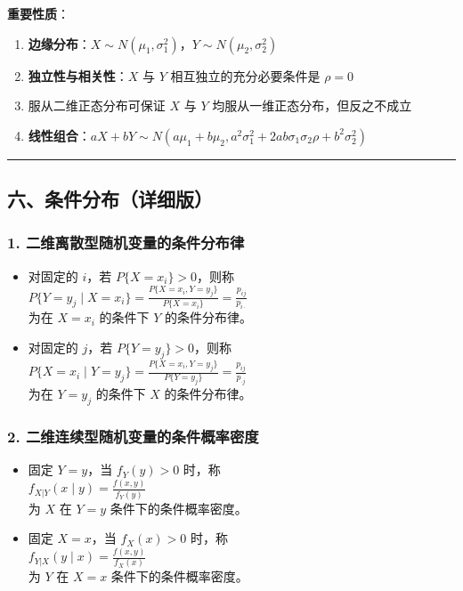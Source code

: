 \documentclass[12pt,a4paper]{ctexart}
\begin{document}
\textbf{重要性质}：
\begin{enumerate}[noitemsep]
    \item \textbf{边缘分布}：$X \sim N(\mu_1, \sigma_1^2)$，$Y \sim N(\mu_2, \sigma_2^2)$
    \item \textbf{独立性与相关性}：$X$ 与 $Y$ 相互独立的充分必要条件是 $\rho = 0$
    \item 服从二维正态分布可保证 $X$ 与 $Y$ 均服从一维正态分布，但反之不成立
    \item \textbf{线性组合}：$aX + bY \sim N(a\mu_1 + b\mu_2, a^2\sigma_1^2 + 2ab\sigma_1\sigma_2\rho + b^2\sigma_2^2)$
\end{enumerate}

\vspace{1em}\hrule\vspace{1em}

\subsection{六、条件分布（详细版）}

\subsubsection{1. 二维离散型随机变量的条件分布律}
\begin{itemize}[noitemsep]
    \item 对固定的 $i$，若 $P\{X = x_i\} > 0$，则称\\
          $P\{Y = y_j \mid X = x_i\} = \frac{P\{X = x_i, Y = y_j\}}{P\{X = x_i\}} = \frac{p_{ij}}{p_{i\cdot}}$ \\
          为在 $X = x_i$ 的条件下 $Y$ 的条件分布律。
    \item 对固定的 $j$，若 $P\{Y = y_j\} > 0$，则称\\
          $P\{X = x_i \mid Y = y_j\} = \frac{P\{X = x_i, Y = y_j\}}{P\{Y = y_j\}} = \frac{p_{ij}}{p_{\cdot j}}$ \\
          为在 $Y = y_j$ 的条件下 $X$ 的条件分布律。
\end{itemize}

\subsubsection{2. 二维连续型随机变量的条件概率密度}
\begin{itemize}[noitemsep]
    \item 固定 $Y = y$，当 $f_Y(y) > 0$ 时，称\\
          $f_{X|Y}(x \mid y) = \frac{f(x, y)}{f_Y(y)}$ \\
          为 $X$ 在 $Y = y$ 条件下的条件概率密度。
    \item 固定 $X = x$，当 $f_X(x) > 0$ 时，称\\
          $f_{Y|X}(y \mid x) = \frac{f(x, y)}{f_X(x)}$ \\
          为 $Y$ 在 $X = x$ 条件下的条件概率密度。
\end{itemize}
\end{document}

